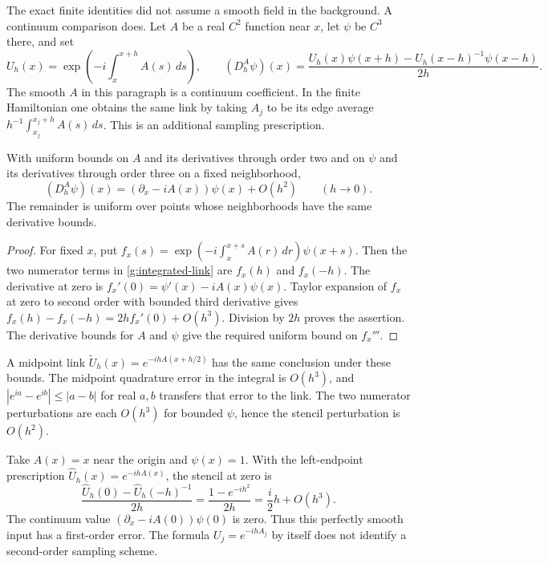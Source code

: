 The exact finite identities did not assume a smooth field in the background. A continuum comparison does. Let $A$ be a real $C^2$ function near $x$, let $\psi$ be $C^3$ there, and set
\begin{equation}\label{g:integrated-link}
 U_h(x)=\exp\left(-i\int_x^{x+h}A(s)\,ds\right),\qquad
 (D_h^A\psi)(x)
 =\frac{U_h(x)\psi(x+h)-U_h(x-h)^{-1}\psi(x-h)}{2h}.
\end{equation}
The smooth $A$ in this paragraph is a continuum coefficient. In the finite Hamiltonian one obtains the same link by taking $A_j$ to be its edge average $h^{-1}\int_{x_j}^{x_j+h}A(s)\,ds$. This is an additional sampling prescription.

\begin{proposition}\label{g:second-order}
With uniform bounds on $A$ and its derivatives through order two and on $\psi$ and its derivatives through order three on a fixed neighborhood,
\begin{equation}\label{g:stencil-limit}
 (D_h^A\psi)(x)=(\partial_x-iA(x))\psi(x)+O(h^2)
 \qquad(h\to0).
\end{equation}
The remainder is uniform over points whose neighborhoods have the same derivative bounds.
\end{proposition}

\begin{proof}
For fixed $x$, put
$f_x(s)=\exp(-i\int_x^{x+s}A(r)\,dr)\psi(x+s)$.
Then the two numerator terms in \eqref{g:integrated-link} are $f_x(h)$ and $f_x(-h)$. The derivative at zero is
$f_x'(0)=\psi'(x)-iA(x)\psi(x)$.
Taylor expansion of $f_x$ at zero to second order with bounded third derivative gives
$f_x(h)-f_x(-h)=2hf_x'(0)+O(h^3)$.
Division by $2h$ proves the assertion. The derivative bounds for $A$ and $\psi$ give the required uniform bound on $f_x'''$.
\end{proof}

A midpoint link $\widetilde U_h(x)=e^{-ihA(x+h/2)}$ has the same conclusion under these bounds. The midpoint quadrature error in the integral is $O(h^3)$, and $|e^{ia}-e^{ib}|\le|a-b|$ for real $a,b$ transfers that error to the link. The two numerator perturbations are each $O(h^3)$ for bounded $\psi$, hence the stencil perturbation is $O(h^2)$.

\begin{example}\label{g:endpoint-counterexample}
Take $A(x)=x$ near the origin and $\psi(x)=1$. With the left-endpoint prescription $\widehat U_h(x)=e^{-ihA(x)}$, the stencil at zero is
\[
 \frac{\widehat U_h(0)-\widehat U_h(-h)^{-1}}{2h}
 =\frac{1-e^{-ih^2}}{2h}=\frac{i}{2}h+O(h^3).
\]
The continuum value $(\partial_x-iA(0))\psi(0)$ is zero. Thus this perfectly smooth input has a first-order error. The formula $U_j=e^{-ihA_j}$ by itself does not identify a second-order sampling scheme.
\end{example}

